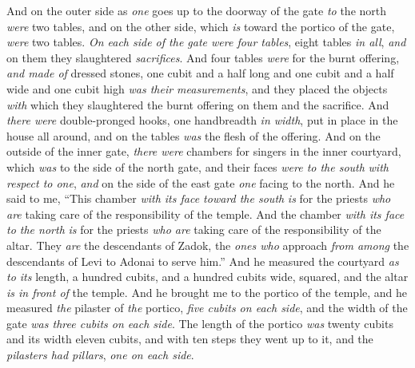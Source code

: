 \begin{biblechapter}
\verse And on the outer side as \textit{one} goes up to the doorway of the gate \textit{to} the north \textit{were} two tables, and on the other side, which \textit{is} toward the portico of the gate, \textit{were} two tables.
\verse \textit{On each side of the gate were four tables}, eight tables \textit{in all}, \textit{and} on them they slaughtered \textit{sacrifices}.
\verse And four tables \textit{were} for the burnt offering, \textit{and made of} dressed stones, one cubit and a half long and one cubit and a half wide and one cubit high \textit{was their measurements}, and they placed the objects \textit{with} which they slaughtered the burnt offering on them and the sacrifice.
\verse And \textit{there were} double-pronged hooks, one handbreadth \textit{in width}, put in place in the house all around, and on the tables \textit{was} the flesh of the offering.
 And on the outside of the inner gate, \textit{there were} chambers for singers in the inner courtyard, which \textit{was} to the side of the north gate, and their faces \textit{were to the south} \textit{with respect to one}, \textit{and} on the side of the east gate \textit{one} facing to the north.
\verse And he said to me, “This chamber \textit{with its face toward the south} \textit{is} for the priests \textit{who are} taking care of the responsibility of the temple.
\verse And the chamber \textit{with its face to the north} \textit{is} for the priests \textit{who are} taking care of the responsibility of the altar. They \textit{are} the descendants of Zadok, the \textit{ones who} approach \textit{from among} the descendants of Levi to Adonai to serve him.”
 And he measured the courtyard \textit{as to its} length, a hundred cubits, and a hundred cubits wide, squared, and the altar \textit{is in front of} the temple.
\verse And he brought me to the portico of the temple, and he measured \textit{the} pilaster of \textit{the} portico, \textit{five cubits on each side}, and the width of the gate \textit{was three cubits on each side}.
\verse The length of the portico \textit{was} twenty cubits and its width eleven cubits, and with ten steps they went up to it, and the \textit{pilasters had pillars}, \textit{one on each side}.
\end{biblechapter}

